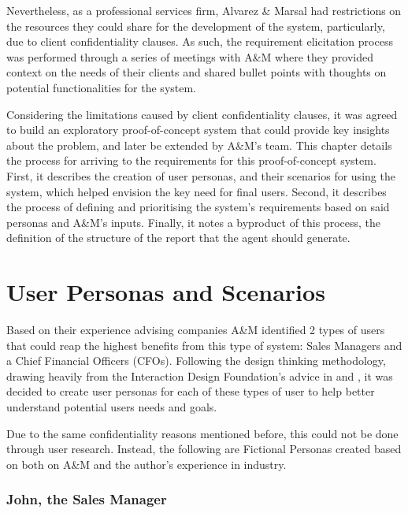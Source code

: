 \documentclass[a4paper]{report}
\begin{document}
Nevertheless, as a professional services firm, Alvarez \& Marsal had restrictions on the resources they could share for the development of the system, particularly, due to client confidentiality clauses. As such, the requirement elicitation process was performed through a series of meetings with A\&M where they provided context on the needs of their clients and shared bullet points with thoughts on potential functionalities for the system.

Considering the limitations caused by client confidentiality clauses, it was agreed to build an exploratory proof-of-concept system that could provide key insights about the problem, and later be extended by A\&M's team. This chapter details the process for arriving to the requirements for this proof-of-concept system. First, it describes the creation of user personas, and their scenarios for using the system, which helped envision the key need for final users. Second, it describes the process of defining and prioritising the system's requirements based on said personas and A\&M's inputs. Finally, it notes a byproduct of this process, the definition of the structure of the report that the agent should generate.

\section{User Personas and Scenarios}

Based on their experience advising companies A\&M identified 2 types of users that could reap the highest benefits from this type of system: Sales Managers and a Chief Financial Officers (CFOs). Following the design thinking methodology, drawing heavily from the Interaction Design Foundation's advice in \cite{ixdf_personas_2025} and \cite{ixdf_user_scenarios_2025}, it was decided to create user personas for each of these types of user to help better understand potential users needs and goals.

Due to the same confidentiality reasons mentioned before, this could not be done through user research. Instead, the following are Fictional Personas created based on both on A\&M and the author's experience in industry.

\subsubsection{John, the Sales Manager}
\end{document}
